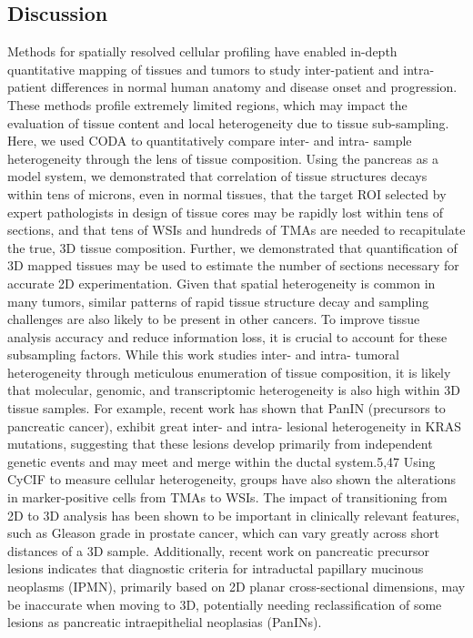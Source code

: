\begin{refsection}
    \section{Discussion}
    Methods for spatially resolved cellular profiling have enabled in-depth quantitative mapping of tissues and tumors to study inter-patient and intra-patient differences in normal human anatomy and disease onset and progression. These methods profile extremely limited regions, which may impact the evaluation of tissue content and local heterogeneity due to tissue sub-sampling. 
    Here, we used CODA to quantitatively compare inter- and intra- sample heterogeneity through the lens of tissue composition. Using the pancreas as a model system, we demonstrated that correlation of tissue structures decays within tens of microns, even in normal tissues, that the target ROI selected by expert pathologists in design of tissue cores may be rapidly lost within tens of sections, and that tens of WSIs and hundreds of TMAs are needed to recapitulate the true, 3D tissue composition. Further, we demonstrated that quantification of 3D mapped tissues may be used to estimate the number of sections necessary for accurate 2D experimentation. Given that spatial heterogeneity is common in many tumors, similar patterns of rapid tissue structure decay and sampling challenges are also likely to be present in other cancers. To improve tissue analysis accuracy and reduce information loss, it is crucial to account for these subsampling factors.
    While this work studies inter- and intra- tumoral heterogeneity through meticulous enumeration of tissue composition, it is likely that molecular, genomic, and transcriptomic heterogeneity is also high within 3D tissue samples. For example, recent work has shown that PanIN (precursors to pancreatic cancer), exhibit great inter- and intra- lesional heterogeneity in KRAS mutations, suggesting that these lesions develop primarily from independent genetic events and may meet and merge within the ductal system.5,47 Using CyCIF to measure cellular heterogeneity, groups have also shown the alterations in marker-positive cells from TMAs to WSIs\cite{Lin2023Multiplexed}.
    The impact of transitioning from 2D to 3D analysis has been shown to be important in clinically relevant features, such as Gleason grade in prostate cancer, which can vary greatly across short distances of a 3D sample\cite{Liu2024Engineering,Koyuncu2023Visual,Bishop2024end,Lin2023Multiplexed,Song2024Analysis,Serafin2023Nondestructive,Marx2023Researchers,Coy20232D,Fukui2019Evaluation,Katsamenis2019X}. Additionally, recent work on pancreatic precursor lesions indicates that diagnostic criteria for intraductal papillary mucinous neoplasms (IPMN), primarily based on 2D planar cross-sectional dimensions, may be inaccurate when moving to 3D, potentially needing reclassification of some lesions as pancreatic intraepithelial neoplasias (PanINs)\cite{Kiemen2024PanIN}.

\end{refsection}
